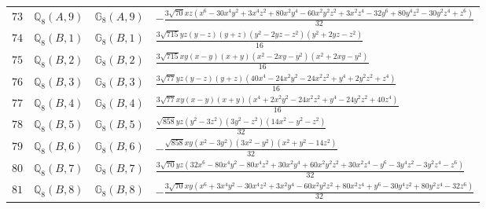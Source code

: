 \documentclass[fleqn,8pt,landscape]{jsarticle}
\begin{document}
\begin{table}[ht!]
\begin{center}
\begin{tabular}{cccl}
$ 73 $ & $ \mathbb{Q}_{8}(A,9) $ & $ \mathbb{G}_{8}(A,9) $ & $ - \frac{3 \sqrt{70} x z \left(x^{6} - 30 x^{4} y^{2} + 3 x^{4} z^{2} + 80 x^{2} y^{4} - 60 x^{2} y^{2} z^{2} + 3 x^{2} z^{4} - 32 y^{6} + 80 y^{4} z^{2} - 30 y^{2} z^{4} + z^{6}\right)}{32} $ \\
$ 74 $ & $ \mathbb{Q}_{8}(B,1) $ & $ \mathbb{G}_{8}(B,1) $ & $ \frac{3 \sqrt{715} y z \left(y - z\right) \left(y + z\right) \left(y^{2} - 2 y z - z^{2}\right) \left(y^{2} + 2 y z - z^{2}\right)}{16} $ \\
$ 75 $ & $ \mathbb{Q}_{8}(B,2) $ & $ \mathbb{G}_{8}(B,2) $ & $ \frac{3 \sqrt{715} x y \left(x - y\right) \left(x + y\right) \left(x^{2} - 2 x y - y^{2}\right) \left(x^{2} + 2 x y - y^{2}\right)}{16} $ \\
$ 76 $ & $ \mathbb{Q}_{8}(B,3) $ & $ \mathbb{G}_{8}(B,3) $ & $ \frac{3 \sqrt{77} y z \left(y - z\right) \left(y + z\right) \left(40 x^{4} - 24 x^{2} y^{2} - 24 x^{2} z^{2} + y^{4} + 2 y^{2} z^{2} + z^{4}\right)}{16} $ \\
$ 77 $ & $ \mathbb{Q}_{8}(B,4) $ & $ \mathbb{G}_{8}(B,4) $ & $ \frac{3 \sqrt{77} x y \left(x - y\right) \left(x + y\right) \left(x^{4} + 2 x^{2} y^{2} - 24 x^{2} z^{2} + y^{4} - 24 y^{2} z^{2} + 40 z^{4}\right)}{16} $ \\
$ 78 $ & $ \mathbb{Q}_{8}(B,5) $ & $ \mathbb{G}_{8}(B,5) $ & $ \frac{\sqrt{858} y z \left(y^{2} - 3 z^{2}\right) \left(3 y^{2} - z^{2}\right) \left(14 x^{2} - y^{2} - z^{2}\right)}{32} $ \\
$ 79 $ & $ \mathbb{Q}_{8}(B,6) $ & $ \mathbb{G}_{8}(B,6) $ & $ - \frac{\sqrt{858} x y \left(x^{2} - 3 y^{2}\right) \left(3 x^{2} - y^{2}\right) \left(x^{2} + y^{2} - 14 z^{2}\right)}{32} $ \\
$ 80 $ & $ \mathbb{Q}_{8}(B,7) $ & $ \mathbb{G}_{8}(B,7) $ & $ \frac{3 \sqrt{70} y z \left(32 x^{6} - 80 x^{4} y^{2} - 80 x^{4} z^{2} + 30 x^{2} y^{4} + 60 x^{2} y^{2} z^{2} + 30 x^{2} z^{4} - y^{6} - 3 y^{4} z^{2} - 3 y^{2} z^{4} - z^{6}\right)}{32} $ \\
$ 81 $ & $ \mathbb{Q}_{8}(B,8) $ & $ \mathbb{G}_{8}(B,8) $ & $ - \frac{3 \sqrt{70} x y \left(x^{6} + 3 x^{4} y^{2} - 30 x^{4} z^{2} + 3 x^{2} y^{4} - 60 x^{2} y^{2} z^{2} + 80 x^{2} z^{4} + y^{6} - 30 y^{4} z^{2} + 80 y^{2} z^{4} - 32 z^{6}\right)}{32} $ \\
 \hline \hline
\end{tabular}
\end{center}
\end{table}
\end{document}
